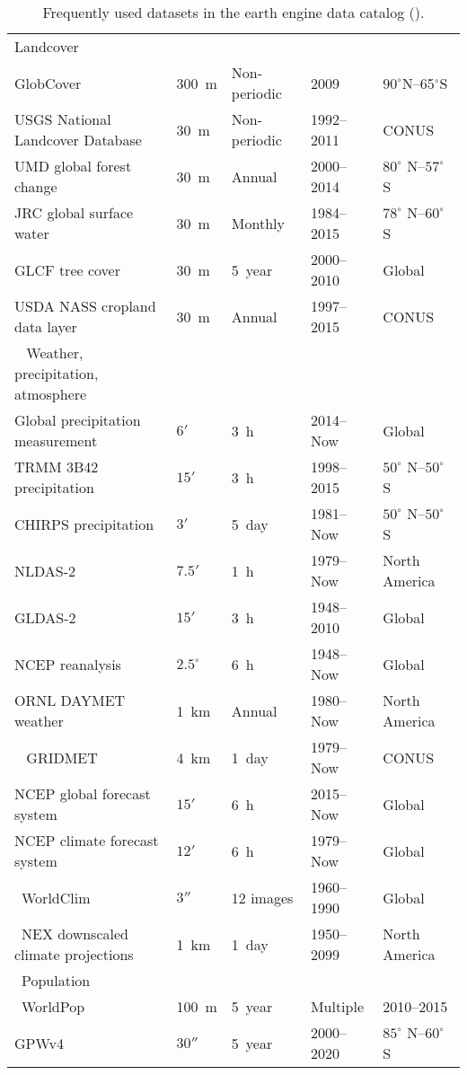 \begin{table}[h]
\begin{tabularx}{\textwidth}{lXXXX}
		 Landcover		& & & & \\			
		 GlobCover	&300 m	&Non-periodic	&2009&	$90^\circ$N–65$^\circ$S\\
		 USGS National Landcover Database&	30 m	&Non-periodic	&1992–2011&	CONUS\\
		 UMD global forest change&	30 m&	Annual	&2000–2014&	$80^\circ$ N–$57^\circ$ S\\
		 JRC global surface water&	30 m&	Monthly	&1984–2015	&$78^\circ$ N–$60^\circ$ S\\
		 GLCF tree cover&	30 m	&5 year	&2000–2010	&Global\\
		 USDA NASS cropland data layer&	30 m&	Annual&	1997–2015&	CONUS\\
		  
		 Weather, precipitation, atmosphere	& & & & \\				
		 Global precipitation measurement& 	$6'$& 	3 h	& 2014–Now& 	Global\\
		 TRMM 3B42 precipitation& 	$15'$& 	3 h	& 1998–2015	& $50^\circ$ N–$50^\circ$ S\\
		 CHIRPS precipitation& 	$3'$& 	5 day& 	1981–Now& 	$50^\circ$ N–$50^\circ$ S\\
		 NLDAS-2& 	$7.5'$& 	1 h	& 1979–Now	& North America\\
		 GLDAS-2& 	$15'$& 	3 h	& 1948–2010	& Global\\
		 NCEP reanalysis& 	$2.5^\circ$ & 	6 h	& 1948–Now& 	Global\\
		 ORNL DAYMET weather& 	1 km& 	Annual& 1980–Now& 	North America\\
		  
		 GRIDMET&	4 km&	1 day&	1979–Now&	CONUS\\
		 NCEP global forecast system&	$15'$&	6 h&	2015–Now&	Global\\
		 NCEP climate forecast system&	$12'$	&6 h&	1979–Now&	Global\\
		 WorldClim	&$3''$ &	12 images&	1960–1990&	Global\\
		 NEX downscaled climate projections&	1 km&	1 day&	1950–2099&	North America\\
		 Population		& & & & \\		
		 WorldPop	&100 m	&5 year	&Multiple	& 2010–2015\\
		 GPWv4	& $30''$ &	5 year&	2000–2020&	$85^\circ$ N–$60^\circ$ S\\
		\bottomrule
	\end{tabularx}
	\caption{Frequently used datasets in the earth engine data catalog (\cite{gorelick2017google}).}
	\label{dependencies}
\end{table}
